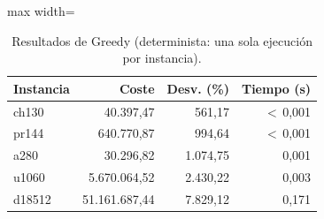\begin{table}[H]
\centering\small\setlength{\tabcolsep}{4pt}\renewcommand{\arraystretch}{1.15}
\begin{adjustbox}{max width=\textwidth}
\begin{tabular}{lrrr}
\toprule
Instancia & Coste & Desv. (\%) & Tiempo (s) \\
\midrule
\rowcolor{gray!10}ch130 & 40{.}397{,}47 & 561{,}17 & $<$\,0{,}001 \\
pr144 & 640{.}770{,}87 & 994{,}64 & $<$\,0{,}001 \\
\rowcolor{gray!10}a280 & 30{.}296{,}82 & 1{.}074{,}75 & 0{,}001 \\
u1060 & 5{.}670{.}064{,}52 & 2{.}430{,}22 & 0{,}003 \\
\rowcolor{gray!10}d18512 & 51{.}161{.}687{,}44 & 7{.}829{,}12 & 0{,}171 \\
\bottomrule
\end{tabular}
\end{adjustbox}
\caption[Resultados de Greedy]{Resultados de Greedy (determinista: una sola ejecución por instancia).}
\label{tab:gre-res}
\end{table}
